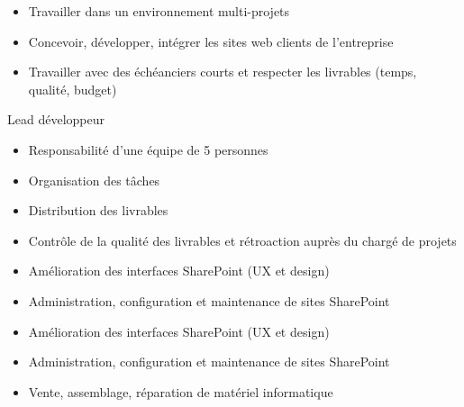 \documentclass[10pt,a4paper]{altacv}
\begin{document}
\begin{itemize}
\item Travailler dans un environnement multi-projets
\item Concevoir, développer, intégrer les sites web clients de l’entreprise
\item Travailler avec des échéanciers courts et respecter les livrables (temps, qualité, budget)

\end{itemize}

\begin{large}
Lead développeur
\end{large}
\begin{itemize}
\item Responsabilité d’une équipe de 5 personnes
\item Organisation des tâches
\item Distribution des livrables
\item Contrôle de la qualité des livrables et rétroaction auprès du chargé de projets
\end{itemize}

\divider

\begin{itemize}
\item Amélioration des interfaces SharePoint (UX et design)
\item Administration, configuration et maintenance de sites SharePoint
\end{itemize}

\divider

\begin{itemize}
\item Amélioration des interfaces SharePoint (UX et design)
\item Administration, configuration et maintenance de sites SharePoint
\end{itemize}

\divider

\begin{itemize}
\item Vente, assemblage, réparation de matériel informatique
\end{itemize}
\end{document}
